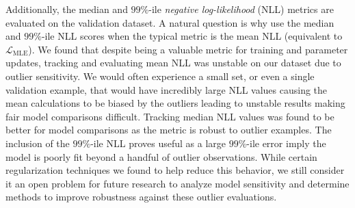 Additionally, the median and $99\%$-ile \textit{negative log-likelihood} (NLL) metrics are evaluated on the validation dataset.
A natural question is why use the median and $99\%$-ile NLL scores when the typical metric is the mean NLL
(equivalent to $\mathcal{L}_{\text{MLE}}$).
We found that despite being a valuable metric for training and parameter updates, tracking and evaluating mean NLL was
unstable on our dataset due to outlier sensitivity.
We would often experience a small set, or even a single validation example, that would have incredibly large NLL
values causing the mean calculations to be biased by the outliers leading to unstable results making fair model comparisons
difficult.
Tracking median NLL values was found to be better for model comparisons as the metric is robust to outlier examples.
The inclusion of the $99\%$-ile NLL proves useful as a large $99\%$-ile error imply
the model is poorly fit beyond a handful of outlier observations.
While certain regularization techniques we found to help reduce this behavior, we still consider it an open problem for
future research to analyze model sensitivity and determine methods to improve robustness against these outlier evaluations.

